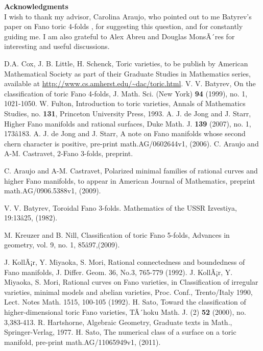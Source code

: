 \documentclass[10pt]{article}
\begin{document}
 



\textbf{Acknowledgments}\\

I wish to thank my advisor, Carolina Araujo, who pointed out to me Batyrev's paper on Fano toric 4-folds \cite{bat}, for suggesting this question, and for constantly guiding me. I am also grateful to Alex Abreu and Douglas MonsÃ´res for interesting and useful discussions. 
 


\begin{thebibliography}{10}
 
 D.A. Cox, J. B. Little, H. Schenck, Toric varieties, to be publish by American Mathematical Society as part of their Graduate Studies in Mathematics series, available at \url{http://www.cs.amherst.edu/~dac/toric.html}.
 V. V. Batyrev, On the classification of toric Fano 4-folds, J. Math. Sci. (New York) \textbf{94} (1999), no. 1, 1021-1050.  
 W. Fulton, Introduction to toric varieties, Annals of Mathematics Studies, no. \textbf{131}, Princeton University Press, 1993.
 A. J. de Jong and J. Starr, Higher Fano manifolds and rational surfaces, Duke Math. J. \textbf{139} (2007), no. 1, 173â183.
 A. J. de Jong and J. Starr, A note on Fano manifolds whose second chern character is positive, pre-print  math.AG/0602644v1, (2006).
 C. Araujo and A-M. Castravet, 2-Fano 3-folds, preprint.

 C. Araujo and A-M. Castravet, Polarized minimal families of rational curves and higher Fano manifolds, to appear in American Journal of Mathematics, preprint math.AG/0906.5388v1, (2009).

 V. V. Batyrev, Toroidal Fano 3-folds. Mathematics of the USSR Izvestiya, 19:13â25, (1982).

 M. Kreuzer and B. Nill, Classification of toric Fano 5-folds, Advances in geometry, vol. 9, no. 1, 85â97,(2009).

 J. KollÃ¡r, Y. Miyaoka, S. Mori, Rational connectedness and boundedness of
Fano manifolds, J. Differ. Geom. 36, No.3, 765-779 (1992).
 J. KollÃ¡r, Y. Miyaoka, S. Mori, Rational curves on Fano varieties, in Classification of irregular varieties, minimal models and abelian varieties, Proc. Conf., Trento/Italy 1990, Lect. Notes Math. 1515, 100-105 (1992).
 H. Sato, Toward the classification of higher-dimensional toric Fano varieties, TÃ´hoku Math. J. (2) \textbf{52} (2000), no. 3,383-413.
R. Hartshorne, Algebraic Geometry, Graduate texts in Math., Springer-Verlag, 1977.
 H. Sato, The numerical class of a surface on a toric manifold, pre-print math.AG/11065949v1, (2011).
\end{thebibliography}


 
\end{document}
